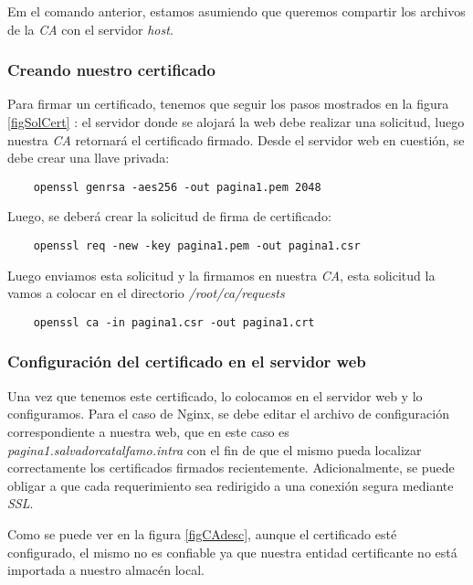 Em el comando anterior, estamos asumiendo que queremos compartir los archivos de la \emph{CA} con el servidor 
\emph{host}.

 



\subsubsection*{Creando nuestro certificado}

Para firmar un certificado, tenemos que seguir los pasos mostrados en la figura \ref{figSolCert}
: el servidor donde se alojará la web debe realizar una solicitud, 
luego nuestra \emph{CA} retornará el certificado firmado. Desde el servidor web en cuestión, se debe 
crear una llave privada:

\begin{verbatim}
    openssl genrsa -aes256 -out pagina1.pem 2048
\end{verbatim}

\noindent Luego, se deberá crear la solicitud de firma de certificado:
\begin{verbatim}
    openssl req -new -key pagina1.pem -out pagina1.csr
\end{verbatim}

\noindent Luego enviamos esta solicitud y la firmamos en nuestra \emph{CA}, esta solicitud la vamos a colocar 
en el directorio \textit{/root/ca/requests}
\begin{verbatim}
    openssl ca -in pagina1.csr -out pagina1.crt
\end{verbatim}

\subsubsection*{Configuración del certificado en el servidor web}
Una vez que tenemos este certificado, lo colocamos en el servidor web y 
lo configuramos. Para el caso de Nginx, se debe editar el archivo de configuración 
correspondiente a nuestra web, que en este caso es \textit{pagina1.salvadorcatalfamo.intra}
con el fin de que el mismo pueda localizar correctamente los certificados firmados recientemente.
Adicionalmente, se puede obligar a que cada requerimiento sea redirigido a una conexión
segura mediante \emph{SSL}.

Como se puede ver en la figura \ref{figCAdesc}, aunque el certificado esté configurado, 
el mismo no es confiable ya que nuestra entidad certificante no está importada a nuestro almacén 
local.

